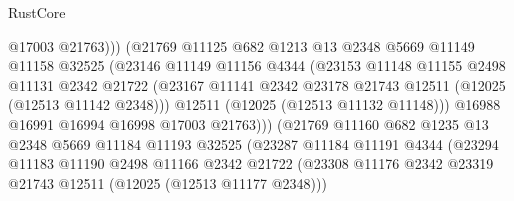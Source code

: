 \begin{lexlean}{RustCore}
\begin{coremodule}
                                  @17003
                                  @21763)))
                            (@21769
                              @11125
                              @682
                              @1213
                              @13
                              @2348
                              @5669
                              @11149
                              @11158
                              @32525
                              (@23146
                                @11149
                                @11156
                                @4344
                                (@23153
                                  @11148
                                  @11155
                                  @2498
                                  @11131
                                  @2342
                                  @21722
                                  (@23167
                                    @11141
                                    @2342
                                    @23178
                                    @21743
                                    @12511
                                    (@12025 (@12513 @11142 @2348)))
                                  @12511
                                  (@12025 (@12513 @11132 @11148)))
                                @16988
                                @16991
                                @16994
                                @16998
                                @17003
                                @21763)))
                          (@21769
                            @11160
                            @682
                            @1235
                            @13
                            @2348
                            @5669
                            @11184
                            @11193
                            @32525
                            (@23287
                              @11184
                              @11191
                              @4344
                              (@23294
                                @11183
                                @11190
                                @2498
                                @11166
                                @2342
                                @21722
                                (@23308
                                  @11176
                                  @2342
                                  @23319
                                  @21743
                                  @12511
                                  (@12025 (@12513 @11177 @2348)))

\end{coremodule}
\end{lexlean}

